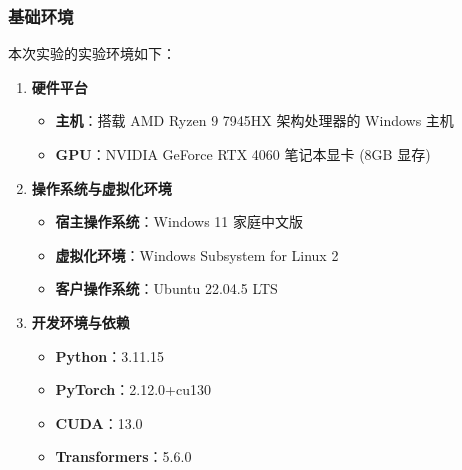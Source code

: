 \documentclass[12pt]{ctexart}
\begin{document}
\subsubsection{基础环境}

本次实验的实验环境如下：

\begin{enumerate}

    \item \textbf{硬件平台}

          \begin{itemize}

              \item \textbf{主机}：搭载 AMD Ryzen 9 7945HX 架构处理器的 Windows 主机

              \item \textbf{GPU}：NVIDIA GeForce RTX 4060 笔记本显卡 (8GB 显存)

          \end{itemize}

    \item \textbf{操作系统与虚拟化环境}

          \begin{itemize}

              \item \textbf{宿主操作系统}：Windows 11 家庭中文版

              \item \textbf{虚拟化环境}：Windows Subsystem for Linux 2

              \item \textbf{客户操作系统}：Ubuntu 22.04.5 LTS

          \end{itemize}

    \item \textbf{开发环境与依赖}

          \begin{itemize}

              \item \textbf{Python}：3.11.15

              \item \textbf{PyTorch}：2.12.0+cu130

              \item \textbf{CUDA}：13.0

              \item \textbf{Transformers}：5.6.0

          \end{itemize}


\end{enumerate}
\end{document}
